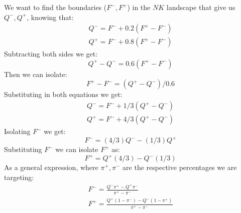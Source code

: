 \documentclass[12pt]{article}
\begin{document}
	We want to find the boundaries ($F^-,F^+$) in the $NK$ landscape that give us $Q^-,Q^+$, knowing that:
	\begin{equation}
		\begin{aligned}
			Q^- = F^- + 0.2(F^+-F^-)\\
			Q^+ = F^- + 0.8(F^+-F^-)
		\end{aligned}
	\end{equation}
	Subtracting both sides we get:
	\begin{equation}
		Q^+-Q^- = 0.6(F^+-F^-)
	\end{equation}
	Then we can isolate:
	\begin{equation}
		F^+-F^- = (Q^+-Q^-)/0.6
	\end{equation}
	Substituting in both equations we get:
	\begin{equation}
		\begin{aligned}
			Q^- = F^- + 1/3(Q^+-Q^-)\\
			Q^+ = F^- + 4/3(Q^+-Q^-)
		\end{aligned}
	\end{equation}
	Isolating $F^-$ we get:
	\begin{equation}
		F^- = (4/3)Q^--(1/3)Q^+ 
	\end{equation}
	Substituting $F^-$ we can isolate $F^+$ as:
	\begin{equation}
		F^+ = Q^+(4/3)-Q^-(1/3)
	\end{equation}
	As a general expression, where $\pi^+,\pi^-$ are the respective percentages we are targeting:
	\begin{equation}
		\begin{aligned}
			F^-=\frac{Q^-\pi^+-Q^+\pi^-}{\pi^+-\pi^-}\\
			F^+=\frac{Q^+(1-\pi^-)-Q^-(1-\pi^+)}{\pi^+-\pi^-}
		\end{aligned}
	\end{equation}
	
\end{document}
